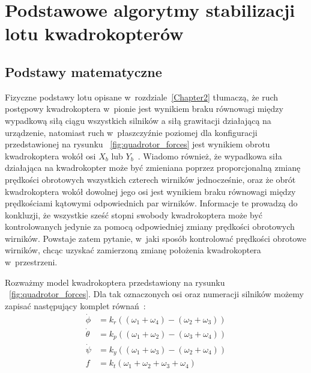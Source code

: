 


\chapter{Podstawowe algorytmy stabilizacji lotu kwadrokopterów} %

\label{Chapter3} %



\section{Podstawy matematyczne}

Fizyczne podstawy lotu opisane w~rozdziale~\ref{Chapter2} tłumaczą, że ruch postępowy kwadrokoptera w~pionie jest wynikiem braku równowagi między wypadkową siłą ciągu wszystkich silników a siłą grawitacji działającą na urządzenie, natomiast ruch w~płaszczyźnie poziomej dla konfiguracji przedstawionej na rysunku ~\ref{fig:quadrotor_forces} jest wynikiem obrotu kwadrokoptera wokół osi $X_b$ lub $Y_b$~\cite{quadro8, quadro9}. Wiadomo również, że wypadkowa siła działająca na kwadrokopter może być zmieniana poprzez proporcjonalną zmianę prędkości obrotowych wszystkich czterech wirników jednocześnie, oraz że obrót kwadrokoptera wokół dowolnej jego osi jest wynikiem braku równowagi między prędkościami kątowymi odpowiednich par wirników. Informacje te prowadzą do konkluzji, że wszystkie sześć stopni swobody kwadrokoptera może być kontrolowanych jedynie za pomocą odpowiedniej zmiany prędkości obrotowych wirników. Powstaje zatem pytanie, w~jaki sposób kontrolować prędkości obrotowe wirników, chcąc uzyskać zamierzoną zmianę położenia kwadrokoptera w~przestrzeni. 

Rozważmy model kwadrokoptera przedstawiony na rysunku ~\ref{fig:quadrotor_forces}. Dla tak oznaczonych osi oraz numeracji silników możemy zapisać następujący komplet równań~\cite{quadro9}:
\begin{equation}
\begin{aligned}
	\dot{\phi} &= k_r((\omega_1 + \omega_4) - (\omega_2 + \omega_3)) \\
	\dot{\theta} &= k_p((\omega_1 + \omega_2) - (\omega_3 + \omega_4)) \\
	\dot{\psi} &= k_y((\omega_1 + \omega_3) - (\omega_2 + \omega_4)) \\
	f &= k_t(\omega_1 + \omega_2 + \omega_3 + \omega_4)
\end{aligned}
\end{equation}

